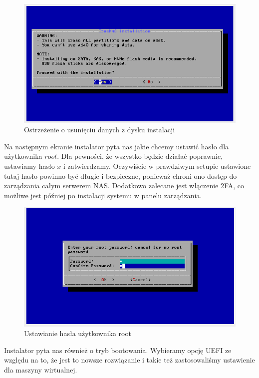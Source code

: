 \documentclass[12pt,a4paper]{article}
\newcommand{\<}{\langle}
\renewcommand{\>}{\rangle}
\theoremstyle{definition}
\begin{document}
\begin{figure}[H]
    \centering
    \includegraphics[width=\linewidth]{img/ss_truenas/5.png}
    \caption{Ostrzeżenie o usunięciu danych z dysku instalacji}
    \label{install_data_warning}
\end{figure}

Na następnym ekranie instalator pyta nas jakie chcemy ustawić hasło dla użytkownika $root$. Dla pewności, że wszystko będzie działać poprawnie, ustawiamy hasło $x$ i zatwierdzamy. Oczywiście w prawdziwym setupie ustawione tutaj hasło powinno być długie i bezpieczne, ponieważ chroni ono dostęp do zarządzania całym serwerem NAS. Dodatkowo zalecane jest włączenie 2FA, co możliwe jest później po instalacji systemu w panelu zarządzania.

\begin{figure}[H]
    \centering
    \includegraphics[width=\linewidth]{img/ss_truenas/6.png}
    \caption{Ustawianie hasła użytkownika root}
    \label{set_password_root}
\end{figure}

Instalator pyta nas również o tryb bootowania. Wybieramy opcję UEFI ze względu na to, że jest to nowsze rozwiązanie i takie też zastosowaliśmy ustawienie dla maszyny wirtualnej.
\end{document}
